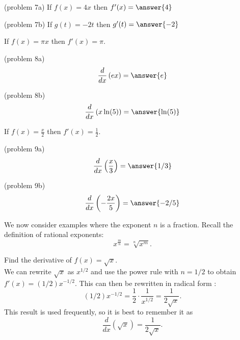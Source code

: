 \documentclass{ximera}
\begin{document}
\begin{problem}(problem 7a)
If $f(x) = 4x$ then $f'(x) = \answer{4}$
\end{problem}

\begin{problem}(problem 7b)
If $g(t) = -2t$ then $g'(t) = \answer{-2}$
\end{problem}



\begin{example}[example 8]
If $f(x) = \pi x$ then $f'(x) = \pi$.
\end{example}

\begin{problem}(problem 8a)
\[
\frac{d}{dx} \left(ex\right) = \answer{e}
\]
\end{problem}



\begin{problem}(problem 8b)
\[
\frac{d}{dx} \left(x\ln(5)\right) = \answer{\ln(5)}
\]
\end{problem}






\begin{example}[example 9]
If $f(x) = \frac{x}{2}$ then $f'(x) = \frac 12$.
\end{example}



\begin{problem}(problem 9a)
\[
\frac{d}{dx} \left(\frac{x}{3}\right) = \answer{1/3}
\]
\end{problem}



\begin{problem}(problem 9b)
\[
\frac{d}{dx} \left(-\frac{2x}{5}\right) = \answer{-2/5}
\]
\end{problem}






We now consider examples where the exponent $n$ is a fraction. Recall the definition of rational exponents:
\[
x^{\frac{m}{n}} = \sqrt[n]{x^m}.
\]



\begin{example}[example 10]
Find the derivative of $f(x) = \sqrt x$.\\
We can rewrite $\sqrt x$ as $x^{1/2}$ and use the power rule 
with $n = 1/2$ to obtain $f'(x) = (1/2)x^{-1/2}$.  This can then be rewritten in radical form :
\[(1/2)x^{-1/2} = \frac{1}{2}\cdot \frac{1}{x^{1/2}} = \frac{1}{2\sqrt x}.\]
This result is used frequently, so it is best to remember it as
\[\frac{d}{dx}\left(\sqrt x\right) = \frac{1}{2\sqrt x}.\]
\end{example}
\end{document}
